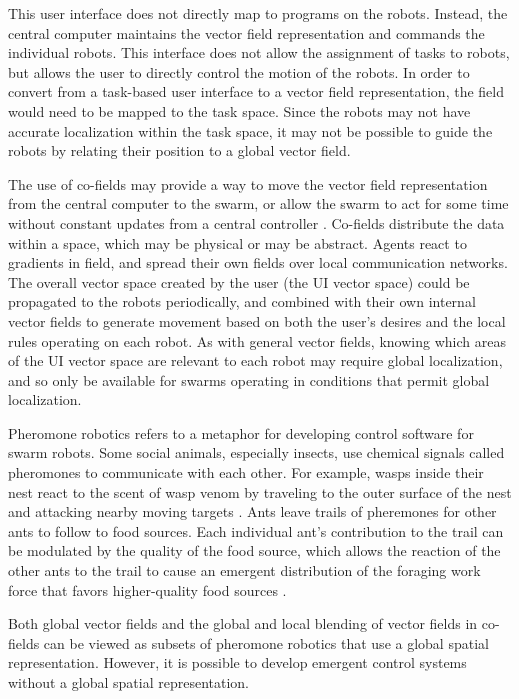 \documentclass[]{article}
\begin{document}
This user interface does not directly map to programs on the robots. 
Instead, the central computer maintains the vector field representation and commands the individual robots.
This interface does not allow the assignment of tasks to robots, but allows the user to directly control the motion of the robots. 
In order to convert from a task-based user interface to a vector field representation, the field would need to be mapped to the task space. 
Since the robots may not have accurate localization within the task space, it may not be possible to guide the robots by relating their position to a global vector field. 

The use of co-fields may provide a way to move the vector field representation from the central computer to the swarm, or allow the swarm to act for some time without constant updates from a central controller \cite{mamei2003co}.
Co-fields distribute the data within a space, which may be physical or may be abstract. 
Agents react to gradients in field, and spread their own fields over local communication networks. 
The overall vector space created by the user (the UI vector space) could be propagated to the robots periodically, and combined with their own internal vector fields to generate movement based on both the user's desires and the local rules operating on each robot. 
As with general vector fields, knowing which areas of the UI vector space are relevant to each robot may require global localization, and so only be available for swarms operating in conditions that permit global localization. 

Pheromone robotics refers to a metaphor for developing control software for swarm robots. 
Some social animals, especially insects, use chemical signals called pheromones to communicate with each other. 
For example, wasps inside their nest react to the scent of wasp venom by traveling to the outer surface of the nest and attacking nearby moving targets \cite{jeanne1981alarm}.
Ants leave trails of pheremones for other ants to follow to food sources. 
Each individual ant's contribution to the trail can be modulated by the quality of the food source, which allows the reaction of the other ants to the trail to cause an emergent distribution of the foraging work force that favors higher-quality food sources \cite{sumpter2003nonlinearity}.

Both global vector fields and the global and local blending of vector fields in co-fields can be viewed as subsets of pheromone robotics that use a global spatial representation. 
However, it is possible to develop emergent control systems without a global spatial representation.
\end{document}

